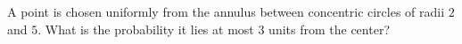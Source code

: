 A point is chosen uniformly from the annulus between concentric circles of radii $2$ and $5$. What is the probability it lies at most $3$ units from the center?
